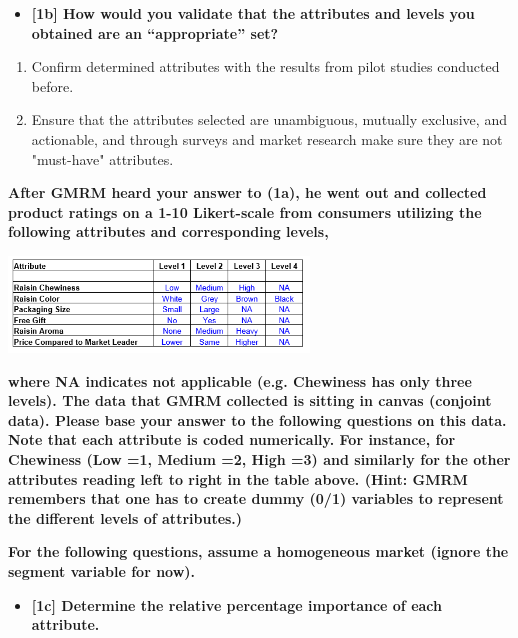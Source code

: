 \documentclass[10pt, oneside,spanish]{article}
\begin{document}
\begin{itemize}
\item \textbf{[1b] How would you validate that the attributes and levels you obtained are an “appropriate” set?}
\end{itemize}
\begin{enumerate}

\item Confirm determined attributes with the results from pilot studies conducted before.

\item Ensure that the attributes selected are unambiguous, mutually exclusive, and actionable, and through surveys and market research make sure they are not "must-have" attributes.




\end{enumerate}

\textbf{After GMRM heard your answer to (1a), he went out and collected product ratings on a 1-10 Likert-scale from consumers utilizing the following attributes and corresponding levels,}

\begin{center}
\includegraphics[width=8cm]{q1.PNG}
\end{center}

\textbf{where NA indicates not applicable (e.g. Chewiness has only three levels).  The data that GMRM collected is sitting in canvas (conjoint data).  Please base your answer to the following questions on this data.  Note that each attribute is coded numerically.  For instance, for Chewiness (Low =1, Medium =2, High =3) and similarly for the other attributes reading left to right in the table above. (Hint: GMRM remembers that one has to create dummy (0/1) variables to represent the different levels of attributes.)}

\textbf{For the following questions, assume a homogeneous market (ignore the segment variable for now). }


\begin{itemize}
\item \textbf{[1c] Determine the relative percentage importance of each attribute.}
\end{itemize}
\end{document}
